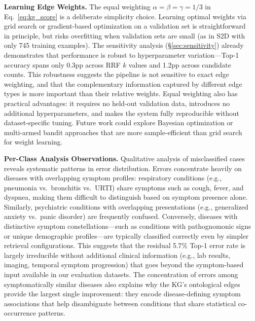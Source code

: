 \documentclass[runningheads]{llncs}
\begin{document}
\textbf{Learning Edge Weights.}
The equal weighting $\alpha = \beta = \gamma = 1/3$ in Eq.~\ref{eq:kg_score} is a deliberate simplicity choice. Learning optimal weights via grid search or gradient-based optimization on a validation set is straightforward in principle, but risks overfitting when validation sets are small (as in S2D with only 745 training examples). The sensitivity analysis (\S\ref{sec:sensitivity}) already demonstrates that performance is robust to hyperparameter variation---Top-1 accuracy spans only 0.3pp across RRF $k$ values and 1.2pp across candidate counts. This robustness suggests the pipeline is not sensitive to exact edge weighting, and that the complementary information captured by different edge types is more important than their relative weights. Equal weighting also has practical advantages: it requires no held-out validation data, introduces no additional hyperparameters, and makes the system fully reproducible without dataset-specific tuning. Future work could explore Bayesian optimization or multi-armed bandit approaches that are more sample-efficient than grid search for weight learning.

\textbf{Per-Class Analysis Observations.}
Qualitative analysis of misclassified cases reveals systematic patterns in error distribution. Errors concentrate heavily on diseases with overlapping symptom profiles: respiratory conditions (e.g., pneumonia vs.\ bronchitis vs.\ URTI) share symptoms such as cough, fever, and dyspnea, making them difficult to distinguish based on symptom presence alone. Similarly, psychiatric conditions with overlapping presentations (e.g., generalized anxiety vs.\ panic disorder) are frequently confused. Conversely, diseases with distinctive symptom constellations---such as conditions with pathognomonic signs or unique demographic profiles---are typically classified correctly even by simpler retrieval configurations. This suggests that the residual 5.7\% Top-1 error rate is largely irreducible without additional clinical information (e.g., lab results, imaging, temporal symptom progression) that goes beyond the symptom-based input available in our evaluation datasets. The concentration of errors among symptomatically similar diseases also explains why the KG's ontological edges provide the largest single improvement: they encode disease-defining symptom associations that help disambiguate between conditions that share statistical co-occurrence patterns.
\end{document}
